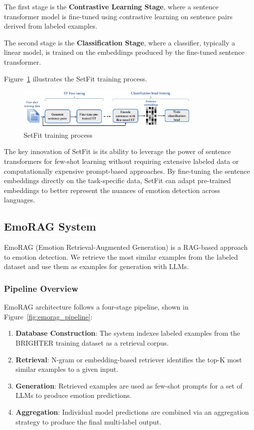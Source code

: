 \documentclass[a4paper,12pt]{extarticle}
\begin{document}
The first stage is the \textbf{Contrastive Learning Stage}, where a sentence transformer model is fine-tuned using contrastive learning on sentence pairs derived from labeled examples. 

The second stage is the \textbf{Classification Stage}, where a classifier, typically a linear model, is trained on the embeddings produced by the fine-tuned sentence transformer.

Figure~\ref{fig:setfit_training} illustrates the SetFit training process.

\begin{figure}[h]
    \centering
    \includegraphics[width=0.8\textwidth]{setfit.png}
    \caption{SetFit training process}
    \label{fig:setfit_training}
\end{figure}

The key innovation of SetFit is its ability to leverage the power of sentence transformers for few-shot learning without requiring extensive labeled data or computationally expensive prompt-based approaches. By fine-tuning the sentence embeddings directly on the task-specific data, SetFit can adapt pre-trained embeddings to better represent the nuances of emotion detection across languages.

\subsection{EmoRAG System}

EmoRAG (Emotion Retrieval-Augmented Generation) is a RAG-based approach to emotion detection.
We retrieve the most similar examples from the labeled dataset and use them as examples for generation with LLMs.

\subsubsection{Pipeline Overview}

EmoRAG architecture follows a four-stage pipeline, shown in Figure~\ref{fig:emorag_pipeline}:

\begin{enumerate}
\item \textbf{Database Construction}: The system indexes labeled examples from the BRIGHTER training dataset as a retrieval corpus.
\item \textbf{Retrieval}: N-gram or embedding-based retriever identifies the top-K most similar examples to a given input.
\item \textbf{Generation}: Retrieved examples are used as few-shot prompts for a set of LLMs to produce emotion predictions.
\item \textbf{Aggregation}: Individual model predictions are combined via an aggregation strategy to produce the final multi-label output.
\end{enumerate}
\end{document}
